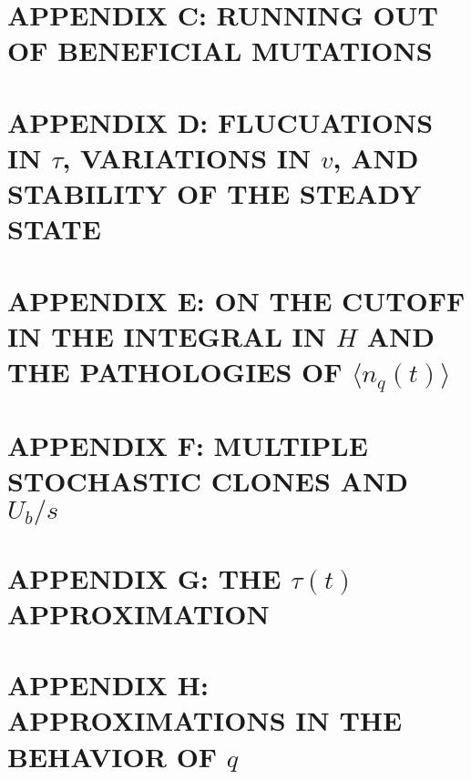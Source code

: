 \documentclass[12pt]{article}
\begin{document}
\section*{APPENDIX C: RUNNING OUT OF BENEFICIAL MUTATIONS}
\section*{APPENDIX D: FLUCUATIONS IN $\tau$, VARIATIONS IN $v$, AND STABILITY OF THE STEADY STATE}
\section*{APPENDIX E: ON THE CUTOFF IN THE INTEGRAL IN $H$ AND THE PATHOLOGIES OF $\langle n_q(t) \rangle$}
\section*{APPENDIX F: MULTIPLE STOCHASTIC CLONES AND $U_b/s$}
\section*{APPENDIX G: THE $\tau (t)$ APPROXIMATION}
\section*{APPENDIX H: APPROXIMATIONS IN THE BEHAVIOR OF $q$}



\end{document}
